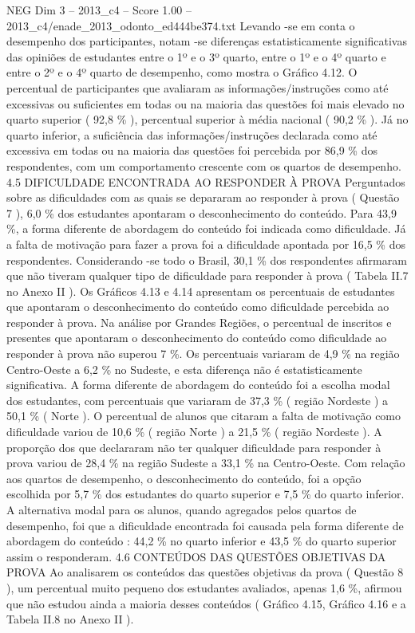 \begin{textsample}{NEG Dim 3 – 2013\_c4 – Score 1.00 – 2013\_c4/enade\_2013\_odonto\_ed444be374.txt}
Levando -se em conta o desempenho dos participantes, notam -se diferenças estatisticamente significativas das opiniões de estudantes entre o 1º e o 3º quarto, entre o 1º e o 4º quarto e entre o 2º e o 4º quarto de desempenho, como mostra o Gráfico 4.12.
O percentual de participantes que avaliaram as informações/instruções como até excessivas ou suficientes em todas ou na maioria das questões foi mais elevado no quarto superior ( 92,8 \% ), percentual superior à média nacional ( 90,2 \% ).
Já no quarto inferior, a suficiência das informações/instruções declarada como até excessiva em todas ou na maioria das questões foi percebida por 86,9 \% dos respondentes, com um comportamento crescente com os quartos de desempenho. 4.5 DIFICULDADE ENCONTRADA AO RESPONDER À PROVA Perguntados sobre as dificuldades com as quais se depararam ao responder à prova ( Questão 7 ), 6,0 \% dos estudantes apontaram o desconhecimento do conteúdo.
Para 43,9 \%, a forma diferente de abordagem do conteúdo foi indicada como dificuldade.
Já a falta de motivação para fazer a prova foi a dificuldade apontada por 16,5 \% dos respondentes.
Considerando -se todo o Brasil, 30,1 \% dos respondentes afirmaram que não tiveram qualquer tipo de dificuldade para responder à prova ( Tabela II.7 no Anexo II ).
Os Gráficos 4.13 e 4.14 apresentam os percentuais de estudantes que apontaram o desconhecimento do conteúdo como dificuldade percebida ao responder à prova.
Na análise por Grandes Regiões, o percentual de inscritos e presentes que apontaram o desconhecimento do conteúdo como dificuldade ao responder à prova não superou 7 \%.
Os percentuais variaram de 4,9 \% na região Centro-Oeste a 6,2 \% no Sudeste, e esta diferença não é estatisticamente significativa.
A forma diferente de abordagem do conteúdo foi a escolha modal dos estudantes, com percentuais que variaram de 37,3 \% ( região Nordeste ) a 50,1 \% ( Norte ).
O percentual de alunos que citaram a falta de motivação como dificuldade variou de 10,6 \% ( região Norte ) a 21,5 \% ( região Nordeste ).
A proporção dos que declararam não ter qualquer dificuldade para responder à prova variou de 28,4 \% na região Sudeste a 33,1 \% na Centro-Oeste.
Com relação aos quartos de desempenho, o desconhecimento do conteúdo, foi a opção escolhida por 5,7 \% dos estudantes do quarto superior e 7,5 \% do quarto inferior.
A alternativa modal para os alunos, quando agregados pelos quartos de desempenho, foi que a dificuldade encontrada foi causada pela forma diferente de abordagem do conteúdo : 44,2 \% no quarto inferior e 43,5 \% do quarto superior assim o responderam. 4.6 CONTEÚDOS DAS QUESTÕES OBJETIVAS DA PROVA Ao analisarem os conteúdos das questões objetivas da prova ( Questão 8 ), um percentual muito pequeno dos estudantes avaliados, apenas 1,6 \%, afirmou que não estudou ainda a maioria desses conteúdos ( Gráfico 4.15, Gráfico 4.16 e a Tabela II.8 no Anexo II ).

\end{textsample}
